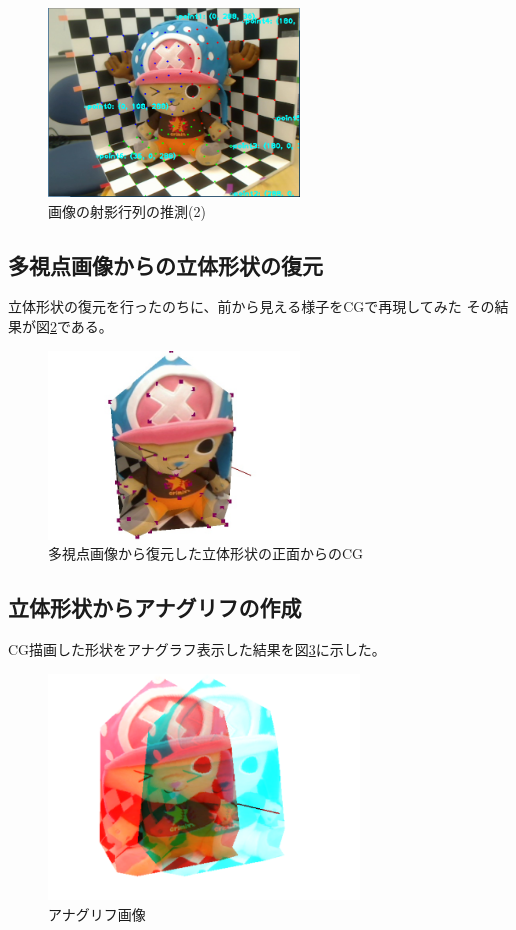 \documentclass[11pt,a4j]{jsarticle}
\makeatletter
\newcommand{\figcaption}[1]{\def\@captype{figure}\caption{#1}}
\makeatother
\begin{document}
\begin{figure}[H]
  \centering
  \includegraphics[height=50mm,bb=0 0 644 483]{image/input1.png}
  \figcaption{画像の射影行列の推測(2)}
  \label{fig:input1}
\end{figure}


\subsection{多視点画像からの立体形状の復元}
\label{sub:result_multimage}

立体形状の復元を行ったのちに、前から見える様子をCGで再現してみた
その結果が図\ref{fig:capture}である。

\begin{figure}[H]
  \centering
  \includegraphics[height=50mm,bb=0 0 644 483]{image/task2.jpg}
  \figcaption{多視点画像から復元した立体形状の正面からのCG}
  \label{fig:capture}
\end{figure}



\subsection{立体形状からアナグリフの作成}
\label{sub:result_anaglyph}

CG描画した形状をアナグラフ表示した結果を図\ref{fig:anaglyph}に示した。


\begin{figure}[H]
  \centering
  \includegraphics[height=60mm,bb=0 0 735 535]{image/ana.png}
  \figcaption{アナグリフ画像}
  \label{fig:anaglyph}
\end{figure}
\end{document}
